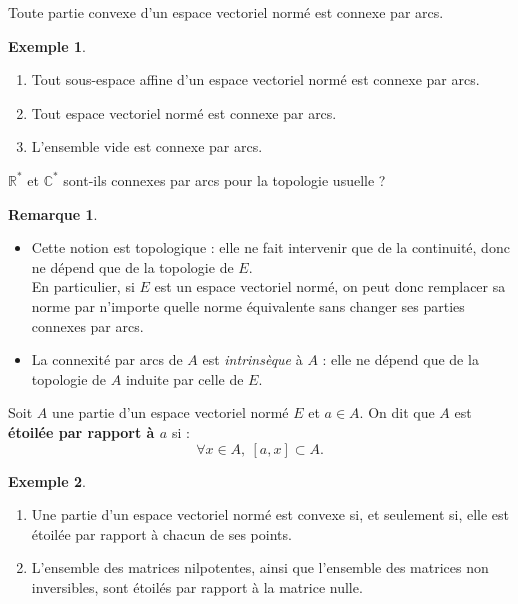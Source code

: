 \documentclass[french]{article}
\newcommand{\R}{\mathbb{R}}
\newcommand{\C}{\mathbb{C}}
\newcommand{\st}{^*}
\theoremstyle{plain}
\theoremstyle{definition}
\newtheorem*{ex}{Exemple}
\newtheorem*{rmq}{Remarque}
\theoremstyle{remark}
\begin{document}
\begin{prop}%
	Toute partie convexe d'un espace vectoriel normé est connexe par arcs.
\end{prop}

\begin{ex}
	\begin{enumerate}
		\item Tout sous-espace affine d'un espace vectoriel normé est connexe par arcs.
		\item Tout espace vectoriel normé est connexe par arcs.
		\item L'ensemble vide est connexe par arcs.
	\end{enumerate}
\end{ex}

\begin{exo}
	$\R\st$ et $\C\st$ sont-ils connexes par arcs pour la topologie usuelle ?
\end{exo}

\begin{rmq}
	\begin{itemize}
		\item Cette notion est topologique : elle ne fait intervenir que de la continuité, donc ne dépend que de la topologie de $E$.\\
		En particulier, si $E$ est un espace vectoriel  normé, on peut donc remplacer sa norme par n'importe quelle norme équivalente sans changer ses parties connexes par arcs.
		\item La connexité par arcs de $A$ est \textit{intrinsèque} à $A$ : elle ne dépend que de la topologie de $A$ induite par celle de $E$.
	\end{itemize}
\end{rmq}

\begin{dfn}
	Soit $A$ une partie d'un espace vectoriel normé $E$ et $a\in A$. On dit que $A$ est \textbf{étoilée par rapport à $a$} si : $$\forall x\in A,\ [a,x]\subset A.$$
\end{dfn}

\begin{ex}
	\begin{enumerate}
		\item Une partie d'un espace vectoriel normé est convexe si, et seulement si, elle est étoilée par rapport à chacun de ses points.
		\item L'ensemble des matrices nilpotentes, ainsi que l'ensemble des matrices non inversibles, sont étoilés par rapport à la matrice nulle.
	\end{enumerate}
\end{ex}
\end{document}
